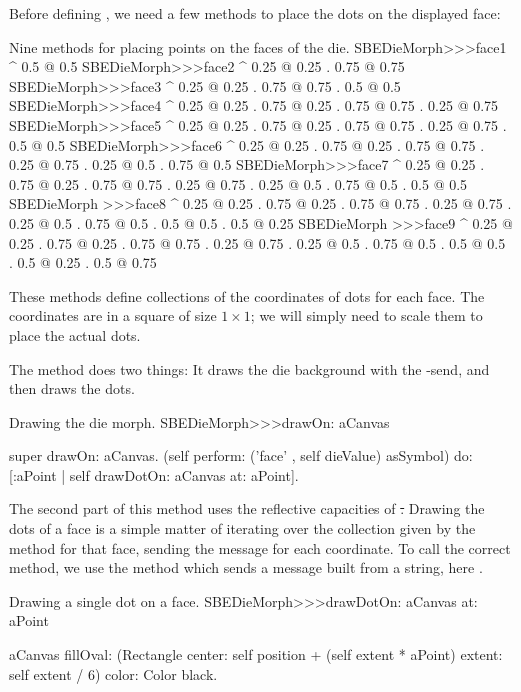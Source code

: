 \documentclass[a4paper,10pt,twoside]{book}
\begin{document}
Before defining , we need a few methods to place the dots on the displayed face:
\begin{methods}{Nine methods for placing points on the faces of the die.}
SBEDieMorph>>>face1
	^ {0.5 @ 0.5}
SBEDieMorph>>>face2
	^ {0.25 @ 0.25 . 0.75 @ 0.75}
SBEDieMorph>>>face3
	^ {0.25 @ 0.25 . 0.75 @ 0.75 . 0.5 @ 0.5}
SBEDieMorph>>>face4
	^ {0.25 @ 0.25 . 0.75 @ 0.25 . 0.75 @ 0.75 . 0.25 @ 0.75}
SBEDieMorph>>>face5
	^ {0.25 @ 0.25 . 0.75 @ 0.25 . 0.75 @ 0.75 . 0.25 @ 0.75 . 0.5 @ 0.5}
SBEDieMorph>>>face6
	^ {0.25 @ 0.25 . 0.75 @ 0.25 . 0.75 @ 0.75 . 0.25 @ 0.75 . 0.25 @ 0.5 . 0.75 @ 0.5}
SBEDieMorph>>>face7
	^ {0.25 @ 0.25 . 0.75 @ 0.25 . 0.75 @ 0.75 . 0.25 @ 0.75 . 0.25 @ 0.5 . 0.75 @ 0.5 . 0.5 @ 0.5}
SBEDieMorph >>>face8
	^ {0.25 @ 0.25 . 0.75 @ 0.25 . 0.75 @ 0.75 . 0.25 @ 0.75 . 0.25 @ 0.5 . 0.75 @ 0.5 . 0.5 @ 0.5 . 0.5 @ 0.25}
SBEDieMorph >>>face9
	^ {0.25 @ 0.25 . 0.75 @ 0.25 . 0.75 @ 0.75 . 0.25 @ 0.75 . 0.25 @ 0.5 . 0.75 @ 0.5 . 0.5 @ 0.5 . 0.5 @ 0.25 . 0.5 @ 0.75}
\end{methods}

These methods define collections of the coordinates of dots for each face.
The coordinates are in a square of size $1 \times 1$; we will simply need to scale them to place the actual dots.

The  method does two things:
It draws the die background with the -send, and then draws the dots.
\begin{method}{Drawing the die morph.}
SBEDieMorph>>>drawOn: aCanvas

	super drawOn: aCanvas.
	(self perform: ('face' , self dieValue) asSymbol) do: [:aPoint |
		self drawDotOn: aCanvas at: aPoint].
\end{method}

The second part of this method uses the reflective capacities of \st.
Drawing the dots of a face is a simple matter of iterating over the collection given by the  method for that face, sending the  message for each coordinate.
To call the correct  method, we use the  method which sends a message built from a string, here .

\begin{method}{Drawing a single dot on a face.}
SBEDieMorph>>>drawDotOn: aCanvas at: aPoint

	aCanvas
		fillOval: (Rectangle
			center: self position + (self extent * aPoint)
			extent: self extent / 6)
		color: Color black.
\end{method}
\end{document}
